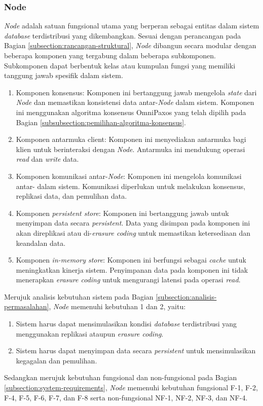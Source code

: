 \subsubsection{Node}
\label{subsubsection:node}

\textit{Node} adalah satuan fungsional utama yang berperan sebagai entitas dalam sistem \textit{database} terdistribusi yang dikembangkan. Sesuai dengan perancangan pada Bagian \ref{subsection:rancangan-struktural}, \textit{Node} dibangun secara modular dengan beberapa komponen yang tergabung dalam beberapa subkomponen. Subkomponen dapat berbentuk kelas atau kumpulan fungsi yang memiliki tanggung jawab spesifik dalam sistem.

\begin{enumerate}
	\item Komponen konsensus: Komponen ini bertanggung jawab mengelola \textit{state} dari \textit{Node} dan memastikan konsistensi data antar-\textit{Node} dalam sistem. Komponen ini menggunakan algoritma konsensus OmniPaxos yang telah dipilih pada Bagian \ref{subsubsection:pemilihan-algoritma-konsensus}.
	\item Komponen antarmuka client: Komponen ini menyediakan antarmuka bagi klien untuk berinteraksi dengan \textit{Node}. Antarmuka ini mendukung operasi \textit{read} dan \textit{write} data.
	\item Komponen komunikasi antar-\textit{Node}: Komponen ini mengelola komunikasi antar- dalam sistem. Komunikasi diperlukan untuk melakukan konsensus, replikasi data, dan pemulihan data.
	\item Komponen \textit{persistent store}: Komponen ini bertanggung jawab untuk menyimpan data secara \textit{persistent}. Data yang disimpan pada komponen ini akan direplikasi atau di-\textit{erasure coding} untuk memastikan ketersediaan dan keandalan data.
	\item Komponen \textit{in-memory store}: Komponen ini berfungsi sebagai \textit{cache} untuk meningkatkan kinerja sistem. Penyimpanan data pada komponen ini tidak menerapkan \textit{erasure coding} untuk mengurangi latensi pada operasi \textit{read}.
\end{enumerate}

Merujuk analisis kebutuhan sistem pada Bagian \ref{subsection:analisis-permasalahan}, \textit{Node} memenuhi kebutuhan 1 dan 2, yaitu:

\begin{enumerate}
	\item Sistem harus dapat mensimulasikan kondisi \textit{database} terdistribusi yang menggunakan replikasi ataupun \textit{erasure coding}.
	\item Sistem harus dapat menyimpan data secara \textit{persistent} untuk mensimulasikan kegagalan dan pemulihan.
\end{enumerate}

Sedangkan merujuk kebutuhan fungsional dan non-fungsional pada Bagian \ref{subsection:system-requirements}, \textit{Node} memenuhi kebutuhan fungsional F-1, F-2, F-4, F-5, F-6, F-7, dan F-8 serta non-fungsional NF-1, NF-2, NF-3, dan NF-4.

